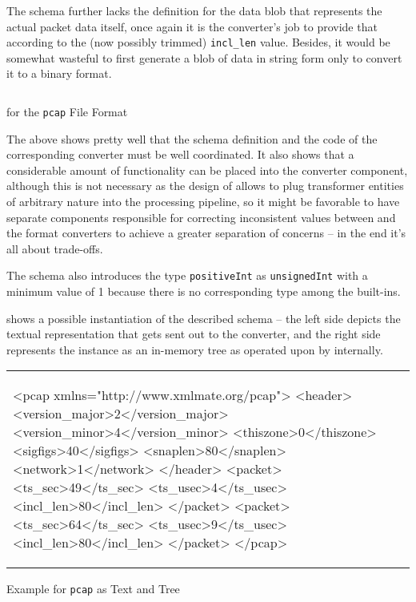 The schema further lacks the definition for the data blob that represents the actual packet data itself, once
again it is the converter's job to provide that according to the (now possibly trimmed) \texttt{incl\_len}
value. Besides, it would be somewhat wasteful to first generate a blob of data in string form only to 
convert it to a binary format.


\begin{listing}[htp]
\centering
\inputminted[frame=lines,fontsize=\small]{xml}{../subjects/pcap/schema/pcap.xsd}
\caption{\xsd for the \texttt{pcap} File Format}
\label{lst:xsdexample}
\end{listing}

The above shows pretty well that the schema definition and the code of the corresponding converter
must be well coordinated. It also shows that a considerable amount of functionality can be placed into the
converter component, although this is not necessary as the design of \xmlmate allows to plug transformer
entities of arbitrary nature into the processing pipeline, so it might be favorable to have separate
components responsible for correcting inconsistent values between \xmlmate and the format converters to achieve
a greater separation of concerns -- in the end it's all about trade-offs.

The schema also introduces the type \texttt{positiveInt} as \texttt{unsignedInt} with a minimum value of 1
because there is no corresponding type among the \xsd built-ins.

 shows a possible instantiation of the described schema -- the left side depicts the
textual representation that gets sent out to the converter, and the right side represents the instance as an
in-memory \xml tree as operated upon by \xmlmate internally.


\begin{listing}[H]
\centering
\begin{tabular}{|m{4.5cm}m{8cm}|}
\begin{xmlcode}
<pcap xmlns="http://www.xmlmate.org/pcap">
	<header>
		<version_major>2</version_major>
		<version_minor>4</version_minor>
		<thiszone>0</thiszone>
		<sigfigs>40</sigfigs>
		<snaplen>80</snaplen>
		<network>1</network>
	</header>
	<packet>
		<ts_sec>49</ts_sec>
		<ts_usec>4</ts_usec>
		<incl_len>80</incl_len>
	</packet>
	<packet>
		<ts_sec>64</ts_sec>
		<ts_usec>9</ts_usec>
		<incl_len>80</incl_len>
	</packet>
</pcap>
\end{xmlcode}
&
\begin{tikzpicture}[grow=right]
\tikzset{level distance=68pt,sibling distance=0pt}
\tikzset{execute at begin node=\strut}
	\Tree [.pcap 
[.packet [.incl\_len 80 ] [.ts\_usec 9 ] [.ts\_sec 64 ] ]
[.packet [.incl\_len 80 ] [.ts\_usec 4 ] [.ts\_sec 49 ] ]
[.header [.network 1 ] [.snaplen 80 ] [.sigfigs 40 ] [.thiszone 0 ] [.version\_minor 4 ] [.version\_major 2 ] ]
]
\end{tikzpicture}
\end{tabular}
\caption{Example \xml for \texttt{pcap} as Text and Tree}
\label{lst:xmlexample}
\end{listing}


